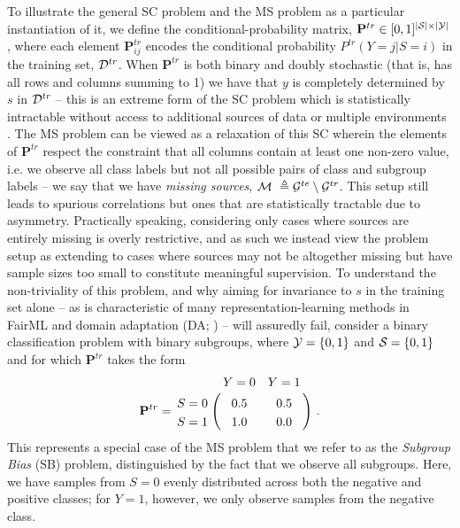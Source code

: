To illustrate the general SC problem and the MS problem as a particular instantiation of it, we
define the conditional-probability matrix, \( \mathbf{P}^{tr} \in [0, 1]^{|{\mathcal{S}}| \times |{\mathcal{Y}}|} \),
where each element \( \mathbf{P}^{tr}_{ij} \) encodes the conditional probability \(
P^{tr}(Y=j|S=i) \) in the training set, \( {\mathcal{D}}^{tr} \). 
%
When \( \mathbf{P}^{tr} \) is both binary and doubly stochastic (that is, has all rows and columns
summing to 1) we have that \(y\) is completely determined by \(s\) in \( {\mathcal{D}}^{tr} \) -- this is an
extreme form of the SC problem which is statistically intractable without access to additional
sources of data \citep{KehBarThoQua20} or multiple environments \citep{arjovsky2019invariant}. 
%
The MS problem can be viewed as a relaxation of this SC wherein the elements of \( \mathbf{P}^{tr}
\) respect the constraint that all columns contain at least one non-zero value, i.e. we observe all
class labels but not all possible pairs of class and subgroup labels -- we say that we have
\emph{missing sources}, \({\mathcal{M}}\ \triangleq {\mathcal{G}}^{te} \setminus {\mathcal{G}}^{tr}\). 
%
This setup still leads to spurious correlations but ones that are statistically tractable due to
asymmetry.
%
Practically speaking, considering only cases where sources are entirely missing is overly
restrictive, and as such we instead view the problem setup as extending to cases where sources may
not be altogether missing but have sample sizes too small to constitute meaningful supervision. 
%
To understand the non-triviality of this problem, and why aiming for invariance to \(s\) in the
training set alone -- as is characteristic of many representation-learning methods in FairML
\citep{edwards2015censoring, madras2018learning, quadrianto2019discovering}  and domain adaptation
(DA; \citep{ganin2016domain, zhao2018adversarial, saito2018maximum, lee2019sliced}) -- will
assuredly fail, consider a binary classification problem with binary subgroups, where \({\mathcal{Y}} = \{ 0,
1 \}\) and \( {\mathcal{S}} = \{ 0, 1 \}\) and for which \( \mathbf{P}^{tr} \) takes the form
%
\begin{align}\label{ms_example}
  \mathbf{P}^{tr} = \bordermatrix{
  & Y=0 & Y=1 \cr
  S=0 & 0.5 & 0.5 \cr
  S=1 & 1.0 & 0.0}~.
\end{align}
%
This represents a special case of the MS problem that we refer to as the \emph{Subgroup Bias} (SB)
problem, distinguished by the fact that we observe all subgroups. 
%
Here, we have samples from $S=0$ evenly distributed across both the negative and positive classes;
for $Y=1$, however, we only observe samples from the negative class. 
